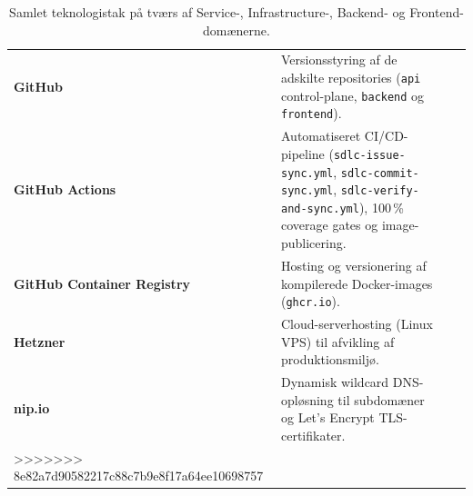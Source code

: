 \documentclass[11pt,a4paper]{article}
\begin{document}
\begin{table}[htbp]
\begin{table}[htbp]
\begin{tabularx}{\textwidth}{P{2.2cm} P{4.0cm} Y P{1.6cm}}
\textbf{GitHub} & Versionsstyring af de adskilte repositories (\texttt{api} control-plane, \texttt{backend} og \texttt{frontend}). \\
\textbf{GitHub Actions} & Automatiseret CI/CD-pipeline (\texttt{sdlc-issue-sync.yml}, \texttt{sdlc-commit-sync.yml}, \texttt{sdlc-verify-and-sync.yml}), 100\,\% coverage gates og image-publicering. \\
\textbf{GitHub Container Registry} & Hosting og versionering af kompilerede Docker-images (\texttt{ghcr.io}). \\
\textbf{Hetzner} & Cloud-serverhosting (Linux VPS) til afvikling af produktionsmiljø. \\
\textbf{nip.io} & Dynamisk wildcard DNS-opløsning til subdomæner og Let's Encrypt TLS-certifikater. \\
>>>>>>> 8e82a7d90582217c88c7b9e8f17a64ee10698757
\bottomrule
\end{tabularx}
\caption{Samlet teknologistak på tværs af Service-, Infrastructure-, Backend- og Frontend-domænerne.}
\label{tab:tech_stack}
\end{table}


\end{table}
\end{document}
